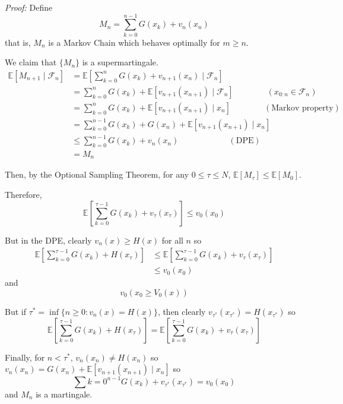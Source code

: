 \documentclass[12pt]{report}
\newcommand{\F}{\mathcal{F}}
\newcommand{\E}{\mathbb{E}}
\newenvironment*{tbox}[2][gray]{
    \begin{tcolorbox}[
        parbox=false,
        colback=#1!5!white,
        colframe=#1!75!black,
        breakable,
        title={#2}
    ]}
    {\end{tcolorbox}}
\begin{document}
    \begin{tbox}{\textbf{Theorem:} Suppose $\{v_0(x), v_1(x), \dots, v_N(x)\}$ is a solution to the DPE. Then $v_n(x) = V_n(x)$ for all $n$. Moreover, define $\tau^* = \inf \{n \geq 0: V_n(x) = H(x)\}$. Then $\tau^*$ is an optimal stopping time.}
        \emph{Proof:} Define 
        \[M_n = \sum_{k=0}^{n- 1} G(x_k) + v_n(x_n)\]
        that is, $M_n$ is a Markov Chain which behaves optimally for $m \geq n$. 

        We claim that $\{M_n\}$ is a supermartingale. 
        \begin{align*}
            \E[M_{n+1} \; | \; \F_n] &= \E\left[\sum_{k=0}^{n} G(x_k) + v_{n+1}(x_n) \; | \; \F_n\right]\\
            &= \sum_{k=0}^n G(x_k) + \E[v_{n+1}(x_{n+1}) \; | \; \F_n] \qquad \qquad (x_{0:n} \in \F_n)\\
            &= \sum_{k=0}^n G(x_k) + \E[v_{n+1}(x_{n+1}) \; | \; x_n] \qquad\qquad (\text{Markov property}) \\
            &= \sum_{k=0}^{n-1} G(x_k) + G(x_n) + \E[v_{n+1}(x_{n+1}) \; | \; x_n]\\
            &\leq \sum_{k=0}^{n-1} G(x_k) + v_n(x_n) \hspace{1in} (\text{DPE})\\
            &= M_n
        \end{align*}

        Then, by the Optional Sampling Theorem, for any $0\leq \tau \leq N$, $\E[M_{\tau}] \leq \E[M_0]$. 

        Therefore, 
        \[\E\left[\sum_{k=0}^{\tau - 1} G(x_k) + v_{\tau}(x_{\tau})\right] \leq v_0(x_0)\]

        But in the DPE, clearly $v_n(x) \geq H(x)$ for all $n$ so 
        \begin{align*}
            \E\left[\sum_{k=0}^{\tau - 1} G(x_k) + H(x_{\tau})\right] &\leq \E\left[\sum_{k=0}^{\tau - 1} G(x_k) + v_{\tau}(x_{\tau})\right]\\ 
                &\leq v_0(x_0) 
        \end{align*}
        and
        \[v_0(x_0 \geq V_0(x))\]

        But if $\tau^* = \inf\{n \geq 0: v_n(x) = H(x)\}$, then clearly $v_{\tau^*}(x_{\tau^*}) = H(x_{\tau^*})$ so 
        \[\E\left[\sum_{k=0}^{\tau - 1} G(x_k) + H(x_{\tau})\right] = \E\left[\sum_{k=0}^{\tau - 1} G(x_k) + v_{\tau}(x_{\tau})\right]\] 

        Finally, for $n < \tau^*$, $v_n(x_n) \neq H(x_n)$ so $v_n(x_n) = G(x_n) + \E[v_{n+1}(x_{n+1}) \; | \; x_n]$ so 
        \[\sum{k=0}^{n-1} G(x_k) + v_{\tau^*}(x_{\tau^*}) = v_0(x_0)\]
        and $M_n$ is a martingale. 
        

    \end{tbox}
\end{document}

